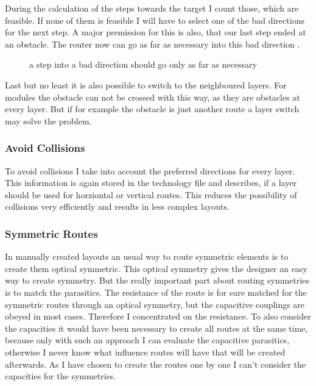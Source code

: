 During the calculation of the steps towards the target I count those, which are feasible. If none of them is feasible I will have to select one of the bad directions for the next step. A major premission for this is also, that our last step ended at an obstacle. The router now can go as far as necessary into this bad direction .

\begin{figure}
	\centering
	
 	\caption{a step into a bad direction should go only as far as necessary}
	\label{fig:router_as_far_as_necessary}
\end{figure}

Last but no least it is also possible to switch to the neighboured layers. For modules the obstacle can not be crossed with this way, as they are obstacles at every layer. But if for example the obstacle is just another route a layer switch may solve the problem.

\subsubsection{Avoid Collisions}
To avoid collisions I take into account the preferred directions for every layer. This information is again stored in the technology file and describes, if a layer should be used for horziontal or vertical routes. This reduces the possibility of collisions very efficiently and results in less complex layouts.

\subsubsection{Symmetric Routes}
In manually created layouts an usual way to route symmetric elements is to create them optical symmetric. This optical symmetry gives the designer an easy way to create symmetry. But the really important part about routing symmetries is to match the parasitics. The resistance of the route is for sure matched for the symmetric routes through an optical symmetry, but the capacitive couplings are obeyed in most cases. Therefore I concentrated on the resistance. To also consider the capacities it would have been necessary to create all routes at the same time, because only with such an approach I can evaluate the capacitive parasitics, otherwise I never know what influence routes will have that will be created afterwards. As I have chosen to create the routes one by one I can't consider the capacities for the symmetries.

